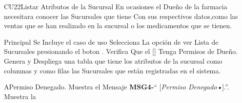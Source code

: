\begin{UseCase}{CU22}{Listar Atributos de la Sucursal}{
	En ocasiones el Dueño de la farmacia necesitara conocer las 
	Sucursales que tiene Con sus respectivos datos,como las ventas
	que se han realizado en la sucursal o los medicamentos que se tienen.
	}
	\end{UseCase}
	\begin{UCtrayectoria}{Principal}
		\UCpaso Se Incluye el caso de uso 
		\UCpaso[\UCactor] Selecciona La opción de ver Lista de Sucursales presionando el boton .
		\UCpaso Verifica Que el [\UCactor] Tenga Permisos de Dueño.
		\UCpaso Genera y Despliega una tabla que tiene los atributos de la sucursal como columnas y como filas las Sucursales que están registradas en el sistema.
	\end{UCtrayectoria}



\begin{UCtrayectoriaA}{A}{Permiso Denegado.}
			\UCpaso Muestra el Mensaje {\bf MSG4-}`` [{\em Permiso Denegado\textsl{•}}].''.
			\UCpaso Muestra la 
\end{UCtrayectoriaA}
			
